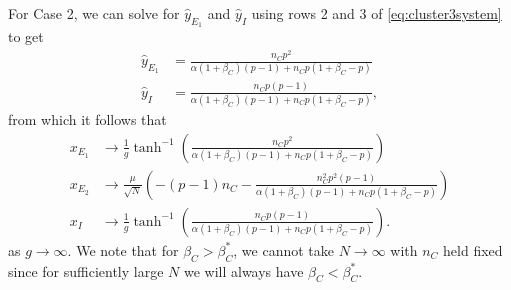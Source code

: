 \documentclass[reqno]{siamonline190516}
\begin{document}
For Case 2, we can solve for $\hat{y}_{E_1}$ and $\hat{y}_I$ using rows 2 and 3 of \cref{eq:cluster3system} to get
\begin{equation}\label{eq:ye1hatyihat}
    \begin{aligned}
        \hat{y}_{E_1} &= \frac{n_C p^2 }{ \alpha(1+\beta_C)(p-1) + n_C p(1 + \beta_C - p)} \\
        \hat{y}_{I} &= \frac{n_C p(p-1) }{ \alpha(1+\beta_C)(p-1) + n_C p(1 + \beta_C - p)},
    \end{aligned}
\end{equation}
from which it follows that
\begin{equation}
    \begin{aligned}
        x_{E_1} &\rightarrow \frac{1}{g} \tanh^{-1} \left( \frac{n_C p^2 }{ \alpha(1+\beta_C)(p-1) + n_C p(1 + \beta_C - p)}  \right) \\
        x_{E_2} &\rightarrow \frac{\mu}{\sqrt{N}}\left( -(p-1)n_C - \frac{n_C^2 p^2(p-1) }{ \alpha(1+\beta_C)(p-1) + n_C p(1 + \beta_C - p)}\right) \\
        x_{I} &\rightarrow \frac{1}{g} \tanh^{-1} \left(\frac{n_C p(p-1) }{ \alpha(1+\beta_C)(p-1) + n_C p(1 + \beta_C - p)} \right).
    \end{aligned}
\end{equation}
as $g \rightarrow \infty$. We note that for $\beta_C > \beta_C^*$, we cannot take $N \rightarrow \infty$ with $n_C$ held fixed since for sufficiently large $N$ we will always have $\beta_C < \beta_C^*$. 
\end{document}
